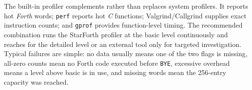 The built-in profiler complements rather than replaces system profilers. It
reports hot \emph{Forth} words; \texttt{perf} reports hot \emph{C} functions;
Valgrind/Callgrind supplies exact instruction counts; and \texttt{gprof}
provides function-level timing. The recommended combination runs the StarForth
profiler at the basic level continuously and reaches for the detailed level or
an external tool only for targeted investigation. Typical failures are simple:
no data usually means one of the two flags is missing, all-zero counts mean no
Forth code executed before \texttt{BYE}, excessive overhead means a level above
basic is in use, and missing words mean the 256-entry capacity was reached.
